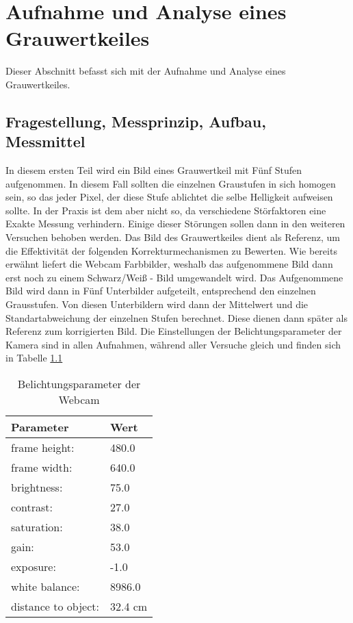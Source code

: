 %
%
\chapter{Aufnahme und Analyse eines Grauwertkeiles}
\label{chap:VERSUCH_1}
Dieser Abschnitt befasst sich mit der Aufnahme und Analyse eines Grauwertkeiles.
\section{Fragestellung, Messprinzip, Aufbau, Messmittel}
\label{chap:VERSUCH_1_FRAGESTELLUNG}
In diesem ersten Teil wird ein Bild eines Grauwertkeil mit Fünf Stufen aufgenommen. In diesem Fall sollten die einzelnen Graustufen in sich homogen sein, so das jeder Pixel, der diese Stufe ablichtet die selbe Helligkeit aufweisen sollte. In der Praxis ist dem aber nicht so, da verschiedene Störfaktoren eine Exakte Messung verhindern. Einige dieser Störungen sollen dann in den weiteren Versuchen behoben werden. Das Bild des Grauwertkeiles dient als Referenz, um die Effektivität der folgenden Korrekturmechanismen zu Bewerten. Wie bereits erwähnt liefert die Webcam Farbbilder, weshalb das aufgenommene Bild dann erst noch zu einem Schwarz/Weiß - Bild umgewandelt wird. Das Aufgenommene Bild wird dann in Fünf Unterbilder aufgeteilt, entsprechend den einzelnen Grausstufen. Von diesen Unterbildern wird dann der Mittelwert und die Standartabweichung der einzelnen Stufen berechnet. Diese dienen dann später als Referenz zum korrigierten Bild. Die Einstellungen der Belichtungsparameter der Kamera sind in allen Aufnahmen, während aller Versuche gleich und finden sich in Tabelle \ref{tab:BelichtungsParamter}
\begin{table}
\centering
\begin{tabular}{l|l}
Parameter & Wert \\
\hline
frame height: & 480.0 \\
frame width: & 640.0 \\
brightness:  &  75.0 \\
contrast:    &  27.0 \\
saturation:  &  38.0\\
gain:        &  53.0\\
exposure:    &  -1.0\\
white balance: & 8986.0 \\
distance to object: & 32.4 cm \\
\end{tabular}
\caption{Belichtungsparameter der Webcam}
\label{tab:BelichtungsParamter}
\end{table}


